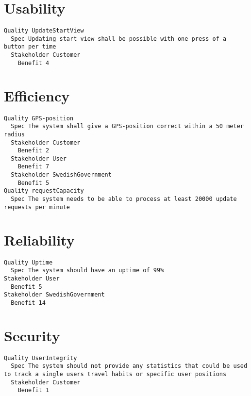 \begin{lstlisting}

\end{lstlisting}


       \section{Usability}


\begin{lstlisting}
Quality UpdateStartView
  Spec Updating start view shall be possible with one press of a button per time
  Stakeholder Customer
    Benefit 4

\end{lstlisting}
    
        
       \section{Efficiency}


\begin{lstlisting}
Quality GPS-position
  Spec The system shall give a GPS-position correct within a 50 meter radius
  Stakeholder Customer
    Benefit 2
  Stakeholder User
    Benefit 7
  Stakeholder SwedishGovernment
    Benefit 5
Quality requestCapacity
  Spec The system needs to be able to process at least 20000 update requests per minute

\end{lstlisting}
    
        
       \section{Reliability}


\begin{lstlisting}
Quality Uptime
  Spec The system should have an uptime of 99%
Stakeholder User
  Benefit 5
Stakeholder SwedishGovernment
  Benefit 14

\end{lstlisting}
    
        
       \section{Security}


\begin{lstlisting}
Quality UserIntegrity
  Spec The system should not provide any statistics that could be used to track a single users travel habits or specific user positions
  Stakeholder Customer
    Benefit 1

\end{lstlisting}